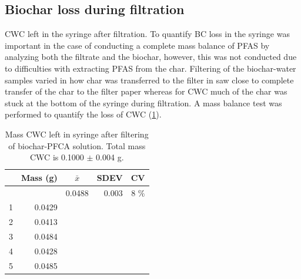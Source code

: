 \subsection{Biochar loss during filtration}
CWC left in the syringe after filtration. To quantify BC loss in the syringe was important in the case of conducting a complete mass balance of PFAS by analyzing both the filtrate and the biochar, however, this was not conducted due to difficulties with extracting PFAS from the char. Filtering of the biochar-water samples varied in how char was transferred to the filter in saw close to complete transfer of the char to the filter paper whereas for CWC much of the char was stuck at the bottom of the syringe during filtration. A mass balance test was performed to quantify the loss of CWC (\cref{appTab:CWCloss}). 

\begin{table}
\centering
\caption{Mass CWC left in syringe after filtering of biochar-PFCA solution. Total mass CWC is 0.1000 $\pm$ 0.004 g.}
\label{appTab:CWCloss}
\begin{tabular}{rrrrr} \toprule
 & Mass (g) & \multicolumn{1}{c}{$\bar{x}$} & \multicolumn{1}{c}{SDEV} & \multicolumn{1}{c}{CV}  \\ \midrule
 & & 0.0488 & 0.003 & 8 $\%$ \\
1 & 0.0429 \\
2 & 0.0413 \\
3 & 0.0484 \\
4 & 0.0428 \\
5 & 0.0485 \\ \bottomrule
\end{tabular}
\end{table}



